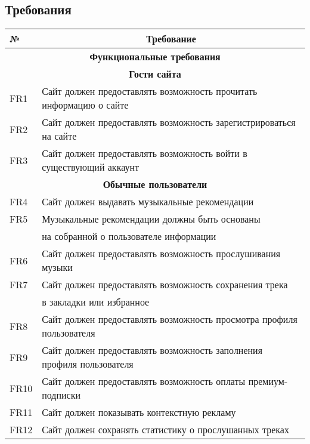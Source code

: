 \subsection{Требования}
\begin{longtable}{|l|l|}
    \hline № & \multicolumn{1}{|c|}{\textbf{Требование}} \\
    \hline
    \endhead

    \multicolumn{2}{|c|}{\textbf{Функциональные требования}} \\

    \hline \multicolumn{2}{|c|}{\textbf{Гости сайта}} \\
    \hline FR1 & Сайт должен предоставлять возможность прочитать информацию о сайте \\
    \hline FR2 & Сайт должен предоставлять возможность зарегистрироваться на сайте \\
    \hline FR3 & Сайт должен предоставлять возможность войти в существующий аккаунт \\

    \hline \multicolumn{2}{|c|}{\textbf{Обычные пользователи}} \\
    \hline FR4  & Сайт должен выдавать музыкальные рекомендации \\
    \hline FR5  & Музыкальные рекомендации должны быть основаны \\
                & на собранной о пользователе информации \\
    \hline FR6  & Сайт должен предоставлять возможность прослушивания музыки \\
    \hline FR7  & Сайт должен предоставлять возможность сохранения трека \\
                & в закладки или избранное \\
    \hline FR8  & Сайт должен предоставлять возможность просмотра профиля пользователя \\
    \hline FR9  & Сайт должен предоставлять возможность заполнения профиля пользователя \\
    \hline FR10 & Сайт должен предоставлять возможность оплаты премиум-подписки \\
    \hline FR11 & Сайт должен показывать контекстную рекламу \\
    \hline FR12 & Сайт должен сохранять статистику о прослушанных треках \\


\end{longtable}
